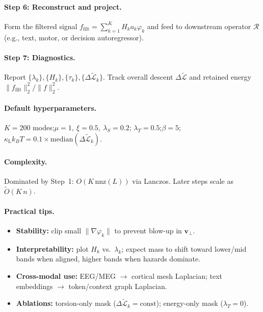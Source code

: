 \documentclass[a4paper,11pt]{article}
\begin{document}
\paragraph{Step 6: Reconstruct and project.}
Form the filtered signal
$f_{\mathrm{filt}}=\sum_{k=1}^K H_k a_k \varphi_k$
and feed to downstream operator $\mathcal{R}$
(e.g., text, motor, or decision autoregressor).

\paragraph{Step 7: Diagnostics.}
Report $\{\lambda_k\},\{H_k\},\{\tau_k\},\{\Delta\widetilde{\mathcal{L}}_k\}$.
Track overall descent $\Delta\widetilde{\mathcal{L}}$ and retained energy
$\|f_{\mathrm{filt}}\|_2^2/\|f\|_2^2$.

\paragraph{Default hyperparameters.}
$K=200$ modes;\quad $\mu=1,\ \xi=0.5,\ \lambda_S=0.2$;\quad
$\lambda_T=0.5$;\quad $\beta=5$;\quad
$\kappa_{\mathrm L}k_B T=0.1\!\times\!\mathrm{median}(\Delta\widetilde{\mathcal{L}}_k)$.

\paragraph{Complexity.}
Dominated by Step~1: $O(K\,\mathrm{nnz}(L))$ via Lanczos.
Later steps scale as $\tilde O(K\,n)$.

\paragraph{Practical tips.}
\begin{itemize}
\item \textbf{Stability:} clip small $\|\nabla\varphi_k\|$ to prevent blow-up
in $\mathbf v_\perp$.
\item \textbf{Interpretability:} plot $H_k$ vs.\ $\lambda_k$; expect mass to
shift toward lower/mid bands when aligned, higher bands when hazards dominate.
\item \textbf{Cross-modal use:} EEG/MEG $\to$ cortical mesh Laplacian; text
embeddings $\to$ token/context graph Laplacian.
\item \textbf{Ablations:} torsion-only mask
($\Delta\widetilde{\mathcal{L}}_k\!=\!\text{const}$); energy-only mask
($\lambda_T=0$).
\end{itemize}
\end{document}
